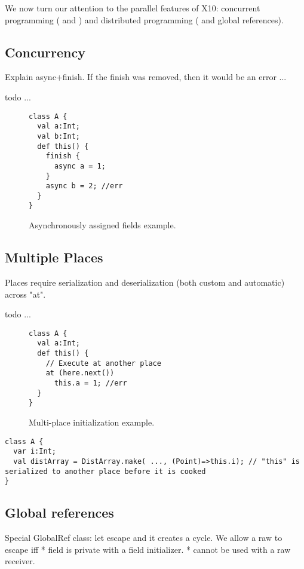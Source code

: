 We now turn our attention to the parallel features of X10:
    concurrent programming ( and )
    and distributed programming ( and global references).


\subsection{Concurrency}
Explain async+finish.
If the finish was removed, then it would be an error ...


 todo ...

\begin{figure}
\begin{lstlisting}
class A {
  val a:Int;
  val b:Int;
  def this() {
    finish {
      async a = 1;
    }
    async b = 2; //err
  }
}
\end{lstlisting}
\caption{Asynchronously assigned fields example.
    }
\label{Figure:Asynchronously-init}
\end{figure}


\subsection{Multiple Places}
\label{Section:Multiple-Places}
Places require serialization and deserialization (both custom and automatic) across "at".

 todo ...

\begin{figure}
\begin{lstlisting}
class A {
  val a:Int;
  def this() {
    // Execute at another place
    at (here.next())
      this.a = 1; //err
  }
}
\end{lstlisting}
\caption{Multi-place initialization example.
    }
\label{Figure:Multi-place}
\end{figure}


\begin{lstlisting}
class A {
  var i:Int;
  val distArray = DistArray.make( ..., (Point)=>this.i); // "this" is serialized to another place before it is cooked
}
\end{lstlisting}

\subsection{Global references}
\label{Section:Global-references}
Special GlobalRef class: let \this escape and it creates a cycle.
We allow a raw \this to escape iff
* field is private with a field initializer.
* cannot be used with a raw \this receiver.


